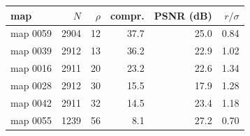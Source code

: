 \begin{tabular}{lrrrrr}
\toprule
map & $N$ & $\rho$ & compr. & PSNR (dB) & $r/\sigma$ \\
\midrule
map 0059 & 2904 & 12 & 37.7 & 25.0 & 0.84 \\
map 0039 & 2912 & 13 & 36.2 & 22.9 & 1.02 \\
map 0016 & 2911 & 20 & 23.2 & 22.6 & 1.34 \\
map 0028 & 2912 & 30 & 15.5 & 17.9 & 1.28 \\
map 0042 & 2911 & 32 & 14.5 & 23.4 & 1.18 \\
map 0055 & 1239 & 56 & 8.1 & 27.2 & 0.70 \\
\bottomrule
\end{tabular}
